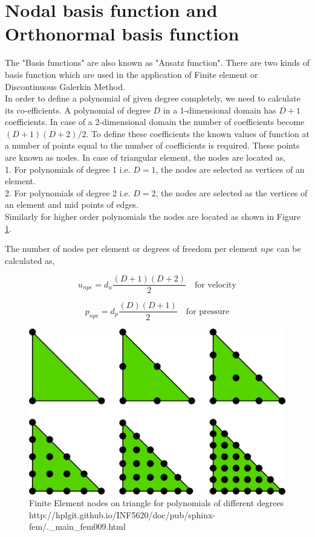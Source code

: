 \documentclass[a4paper,12pt]{book}
\begin{document}
\section[Basis function]{Nodal basis function and Orthonormal basis function}

The "Basis functions" are also known as "Ansatz function". There are two kinds of basis function which are used in the application of Finite element or Discontinuous Galerkin Method. \\
In order to define a polynomial of given degree completely, we need to calculate its co-efficients. A polynomial of degree $D$ in a 1-dimensional domain has $D+1$ coefficients. In case of a 2-dimensional domain the number of coefficients become $(D+1)(D+2)/2$. To define these coefficients the known values of function at a number of points equal to the number of coefficients is required. These points are known as nodes. In case of triangular element, the nodes are located as,\\
1. For polynomials of degree 1 i.e. $D=1$, the nodes are selected as vertices of an element.\\
2. For polynomials of degree 2 i.e. $D=2$, the nodes are selected as the vertices of an element and mid points of edges.\\
Similarly for higher order polynomials the nodes are located as shown in Figure \ref{fig:Nodes on Triangular Element}. 

The number of nodes per element or degrees of freedom per element $npe$ can be calculated as,

\begin{equation} \label{unpe}
u_{npe} = d_u \frac{(D+1)(D+2)}{2} \quad \textrm{for velocity}
\end{equation} 

\begin{equation} \label{pnpe}
p_{npe} = d_p \frac{(D)(D+1)}{2} \quad \textrm{for pressure}
\end{equation} 

\begin{figure} [H]
  \includegraphics[width=\linewidth]{fem_triangle_2.png}
  \caption{Finite Element nodes on triangle for polynomials of different degrees \\ http://hplgit.github.io/INF5620/doc/pub/sphinx-fem/.\_main\_fem009.html}
  \label{fig:Nodes on Triangular Element}
\end{figure}
\end{document}
